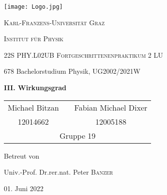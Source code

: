 \begin{titlepage}
    \centering
    \texttt{[image: Logo.jpg]}\par\vspace{0.8cm}
    {\scshape\LARGE Karl-Franzens-Universität Graz \par}
    {\scshape\LARGE Institut für Physik \par}
    \vspace{1cm}
    {\scshape\Large 22S PHY.L02UB Fortgeschrittenenpraktikum 2 LU
\par}
    678 Bachelorstudium Physik, UG2002/2021W\par
    \vspace{1.5cm}
    {\huge\bfseries III. Wirkungsgrad\par}
    \vspace{2cm}
    \begin{table}[H]
        \centering
        \begin{tabular}{c c c}
           \Large Michael Bitzan & & \Large Fabian Michael Dixer \\
           \Large 12014662       & & \Large12005188 \\
           \multicolumn{3}{c}{Gruppe 19}
        \end{tabular}
    \end{table}
    \vfill
    \Large Betreut von\par
    Univ.-Prof. Dr.rer.nat. Peter \textsc{Banzer}

    \vfill

    {\large 01. Juni 2022\par}
\end{titlepage}
